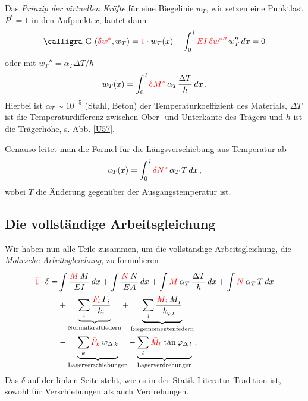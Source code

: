 {{{{Das {\em Prinzip der virtuellen Kr\"{a}fte\/} f\"{u}r eine Biegelinie $w_T$, wir setzen eine Punktlast $P^* = 1$ in den Aufpunkt $x$, lautet dann
\begin{align}
\text{\normalfont\calligra G\,\,}(\textcolor{red}{\delta w^*}, w_T) = \textcolor{red}{1} \cdot w_T(x) - \int_0^{\,l}\textcolor{red}{ EI\,\delta w^*{''}}\,w_T''\,dx = 0
\end{align}
oder mit $w_T'' = \alpha_T \Delta T/h$
\begin{align}
w_T(x) = \int_0^{\,l}\textcolor{red}{ \delta M^*}\,\alpha_T \frac{\Delta T}{h}\,dx \,.
\end{align}
Hierbei ist $\alpha_T \sim 10^{-5}$ (Stahl, Beton) der Temperaturkoeffizient des Materials, $\Delta T$ ist die Temperaturdifferenz zwischen Ober- und Unterkante des Tr\"{a}gers und $h$ ist die Tr\"{a}gerh\"{o}he, s. Abb. \ref{U57}.

Genauso leitet man die Formel f\"{u}r die L\"{a}ngsverschiebung aus Temperatur ab
\begin{align}
u_T(x) = \int_0^{\,l} \textcolor{red}{\delta N^*}\,\alpha_T\,T\,dx\,,
\end{align}
wobei $T$ die \"{A}nderung gegen\"{u}ber der Ausgangstemperatur ist.

{\textcolor{sectionTitleBlue}{\section{Die vollst\"{a}ndige Arbeitsgleichung}}}
Wir haben nun alle Teile zusammen, um die vollst\"{a}ndige Arbeitsgleichung, die {\em Mohrsche Arbeitsgleichung\/}, zu formulieren
  \begin{align}\label{Eq101}
    \textcolor{red}{\bar{1}} \cdot \delta
    = &
    \int\frac{\textcolor{red}{\bar{M}}\,M}{EI}\,dx
    + \int\frac{\textcolor{red}{\bar{N}}\,N}{EA}\,dx + \int \textcolor{red}{\bar{M}}\,\alpha_T\,\frac{\Delta T}{h}\,dx + \int \textcolor{red}{\bar{N}}\,\alpha_T\,T\,dx \nonumber \\
     &+ \underbrace{\sum_i \frac{\textcolor{red}{\bar{F}_i}\,F_i}{k_{i}}}_{\text{Normalkraftfedern}}
    + \underbrace{\sum_j \frac{\textcolor{red}{\bar{M}_j}\,M_j}{k_{\varphi j}}}_{\text{Biegemomentenfedern}}\nonumber \\
    &
    - \underbrace{\sum_k \textcolor{red}{\bar{F}_{k}}\,w_{\Delta\,k}}_{\text{Lagerverschiebungen}}
    - \underbrace{\sum_l \textcolor{red}{\bar{M}_{l}}\,\tan \varphi_{\Delta\,l}}_{\text{Lagerverdrehungen}}\,.
  \end{align}
Das $\delta$ auf der linken Seite steht, wie es in der Statik-Literatur Tradition ist, sowohl f\"{u}r Verschiebungen als auch Verdrehungen.

}}}}
